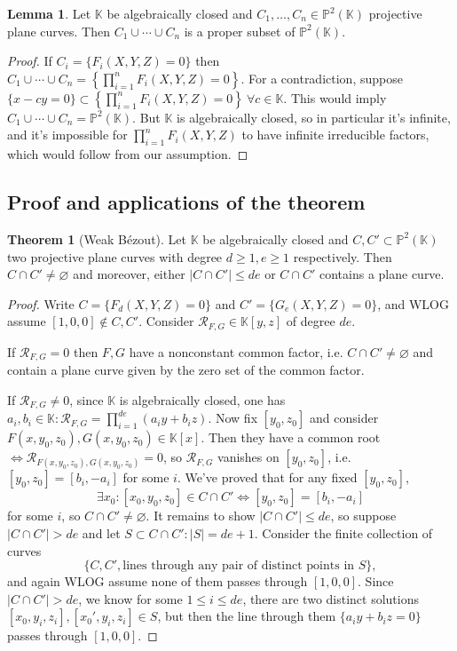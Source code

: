 \documentclass{article}
\newcommand{\K}{\mathbb{K}}
\newcommand{\p}{\mathbb{P}}
\newcommand{\re}{\mathcal{R}}
\theoremstyle{definition}
\newtheorem{thm}[defn]{Theorem}
\newtheorem{lemma}[defn]{Lemma}
\begin{document}
\begin{lemma}
Let $\K$ be algebraically closed and $C_1,\ldots,C_n\in\p^2(\K)$ projective plane curves. Then $C_1\cup\cdots\cup C_n$ is a proper subset of $\p^2(\K)$.
\end{lemma}
\begin{proof}
If $C_i=\{F_i(X,Y,Z)=0\}$ then $C_1\cup\cdots\cup C_n=\left\{\prod_{i=1}^n F_i(X,Y,Z)=0\right\}$. For a contradiction, suppose $\{x-cy=0\}\subset \left\{\prod_{i=1}^n F_i(X,Y,Z)=0\right\} \ \forall c\in\K$. This would imply $C_1\cup\cdots\cup C_n=\p^2(\K)$. But $\K$ is algebraically closed, so in particular it's infinite, and it's impossible for $\prod_{i=1}^n F_i(X,Y,Z)$ to have infinite irreducible factors, which would follow from our assumption.
\end{proof}

\subsection{Proof and applications of the theorem}
\begin{thm}[Weak Bézout]
\label{thm:weakBezout}
Let $\K$ be algebraically closed and $C,C'\subset\p^2(\K)$ two projective plane curves with degree $d\geq 1,e\geq 1$ respectively. Then $C\cap C'\neq\varnothing$ and moreover, either $|C\cap C'|\leq de$ or $C\cap C'$ contains a plane curve.
\end{thm}
\begin{proof}
Write $C=\{F_d(X,Y,Z)=0\}$ and $C'=\{G_e(X,Y,Z)=0\}$, and WLOG assume $[1,0,0]\notin C,C'$. Consider $\re_{F,G}\in\K[y,z]$ of degree $de$.

If $\re_{F,G}=0$ then $F,G$ have a nonconstant common factor, i.e. $C\cap C'\neq\varnothing$ and contain a plane curve given by the zero set of the common factor.

If $\re_{F,G}\neq 0$, since $\K$ is algebraically closed, one has $a_i,b_i\in\K:\re_{F,G}=\prod_{i=1}^{de}(a_iy+b_iz)$. Now fix $[y_0,z_0]$ and consider $F(x,y_0,z_0),G(x,y_0,z_0)\in\K[x]$. Then they have a common root $\iff\re_{F(x,y_0,z_0),G(x,y_0,z_0)}=0$, so $\re_{F,G}$ vanishes on $[y_0,z_0]$, i.e. $[y_0,z_0]=[b_i,-a_i]$ for some $i$. We've proved that for any fixed $[y_0,z_0]$,
\[
\exists x_0:[x_0,y_0,z_0]\in C\cap C'\iff [y_0,z_0]=[b_i,-a_i]
\]
for some $i$, so $C\cap C'\neq\varnothing$. It remains to show $|C\cap C'|\leq de$, so suppose $|C\cap C'|>de$ and let $S\subset C\cap C':|S|=de+1$. Consider the finite collection of curves
\[
\{C,C',\text{lines through any pair of distinct points in }S\},
\]
and again WLOG assume none of them passes through $[1,0,0]$. Since $|C\cap C'|>de$, we know for some $1\leq i\leq de$, there are two distinct solutions $[x_0,y_i,z_i],[x_0',y_i,z_i]\in S$, but then the line through them $\{a_iy+b_iz=0\}$ passes through $[1,0,0]$.
\end{proof}
\end{document}
